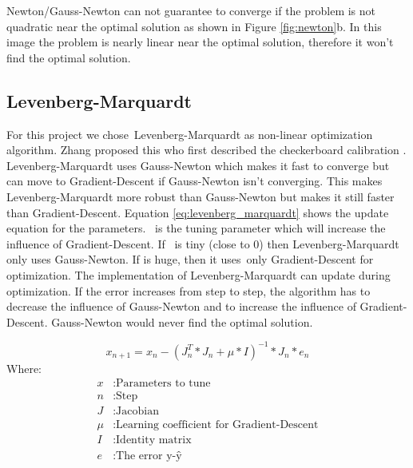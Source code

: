\documentclass[11pt,a4paper,titlepage,oneside]{report}
\begin{document}
Newton/Gauss-Newton can not guarantee to converge if the problem is not quadratic near the optimal solution as shown in Figure \ref{fig:newton}b. In this image the problem is nearly linear near the optimal solution, therefore it won't find the optimal solution.

\subsection{Levenberg-Marquardt}
For this project we chose Levenberg-Marquardt as non-linear optimization algorithm. Zhang proposed this who first described the checkerboard calibration \cite{Zhang}. Levenberg-Marquardt uses Gauss-Newton which makes it fast to converge but can move to Gradient-Descent if Gauss-Newton isn't converging. This makes Levenberg-Marquardt more robust than Gauss-Newton but makes it still faster than Gradient-Descent. Equation \ref{eq:levenberg_marquardt} shows the update equation for the parameters. \mu\ is the tuning parameter which will increase the influence of Gradient-Descent. If \mu\ is tiny (close to 0) then Levenberg-Marquardt only uses Gauss-Newton. If \mu is huge, then it uses only Gradient-Descent for optimization. The implementation of Levenberg-Marquardt can update \mu during optimization. If the error increases from step to step, the algorithm has to decrease the influence of Gauss-Newton and to increase the influence of Gradient-Descent. Gauss-Newton would never find the optimal solution.

\begin{equation}\label{eq:levenberg_marquardt}
  x_{n+1} = x_n - (J_n^T*J_n + \mu*I)^{-1}*J_n*e_n
\end{equation}
Where:
\begin{align*}
  x		  &: \text{Parameters to tune}\\
  n		  &: \text{Step}\\
  J		  &: \text{Jacobian}\\
  \mu	  &: \text{Learning coefficient for Gradient-Descent}\\
  I     &: \text{Identity matrix}\\
  e  	  &: \text{The error y-ŷ}
\end{align*}
\end{document}
